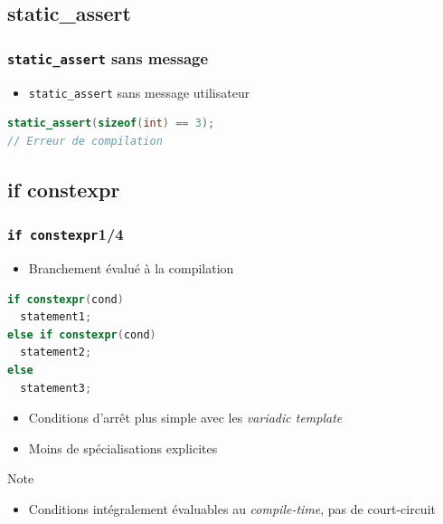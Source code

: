 \documentclass[C++.tex]{subfiles}
\begin{document}
\subsection*{static\_assert}
\begin{frame}[fragile]
	\frametitle{\lstinline|static_assert| sans message}
	\begin{itemize}
		\item \lstinline|static_assert| sans message utilisateur
	\end{itemize}

	\begin{lstlisting}[language=C++]
static_assert(sizeof(int) == 3);
// Erreur de compilation\end{lstlisting}
\end{frame}

\subsection*{if constexpr}
\begin{frame}[fragile]
	\frametitle{\lstinline|if constexpr|\titlehfill{}1/4}
	\begin{itemize}
		\item Branchement évalué à la compilation
	\end{itemize}

	\begin{lstlisting}[language=C++]
if constexpr(cond)
  statement1;
else if constexpr(cond)
  statement2;
else
  statement3;\end{lstlisting}

	\begin{itemize}
		\item Conditions d'arrêt plus simple avec les \textit{variadic template}
		\item Moins de spécialisations explicites

	\end{itemize}

	\begin{block}{Note}
		\begin{itemize}
			\item Conditions intégralement évaluables au \textit{compile-time}, pas de court-circuit
		\end{itemize}

	\end{block}
\end{frame}
\end{document}

